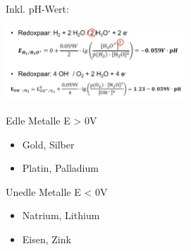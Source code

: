      \begin{minipage}{0.65\linewidth}
        Inkl. pH-Wert:

        \includegraphics[height=2.8cm]{pictures/Nernstph.png}
    \end{minipage}
    \hfill
    \begin{minipage}{0.3\linewidth}
        Edle Metalle E > 0V
        \begin{itemize}
            \item Gold, Silber
            \item Platin, Palladium
        \end{itemize}
        Unedle Metalle E < 0V
        \begin{itemize}
            \item Natrium, Lithium
            \item Eisen, Zink
        \end{itemize}
    \end{minipage}